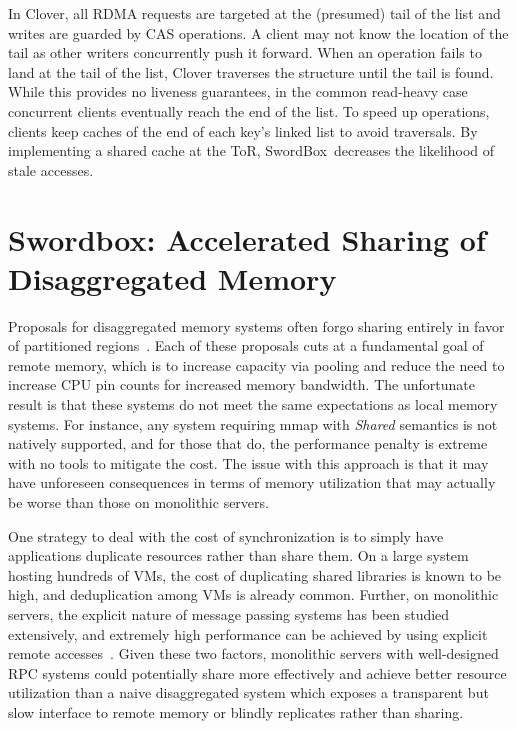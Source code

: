 \documentclass[12pt]{ucsddissertation}
\newcommand{\sword}{SwordBox}
\begin{document}
In Clover, all RDMA requests are targeted at the (presumed) tail of the list and writes are guarded
by CAS operations. A client may not know the location of the tail as other writers concurrently push
it forward. When an operation fails to land at the tail of the list, Clover traverses the structure
until the tail is found. While this provides no liveness guarantees, in the common read-heavy case
concurrent clients eventually reach the end of the list. To speed up operations, clients keep caches
of the end of each key's linked list to avoid traversals. By implementing a shared cache at the ToR,
\sword\ decreases the likelihood of stale accesses.


\chapter{Swordbox: Accelerated Sharing of Disaggregated Memory}
\label{chap:swordbox}


Proposals for disaggregated memory systems often forgo sharing entirely in favor of partitioned
regions~\cite{fastswap,infiniswap,leap,legoos}. Each of these proposals cuts at a fundamental
goal of remote memory, which is to increase capacity via pooling and reduce the need to increase CPU
pin counts for increased memory bandwidth. The unfortunate result is that these systems do not meet
the same expectations as local memory systems. For instance, any system requiring mmap with
\textit{Shared} semantics is not natively supported, and for those that do, the performance penalty
is extreme with no tools to mitigate the cost. The issue with this approach is that it may have
unforeseen consequences in terms of memory utilization that may actually be worse than those on
monolithic servers. 

One strategy to deal with the cost of synchronization is to simply have applications duplicate
resources rather than share them. On a large system hosting hundreds of VMs, the cost of duplicating
shared libraries is known to be high, and deduplication among VMs is already common. Further, on
monolithic servers, the explicit nature of message passing systems has been studied extensively, and
extremely high performance can be achieved by using explicit remote accesses~\cite{erpc,herd}.
Given these two factors, monolithic servers with well-designed RPC systems could potentially share
more effectively and achieve better resource utilization than a naive disaggregated system which
exposes a transparent but slow interface to remote memory or blindly replicates rather than sharing.
\end{document}
